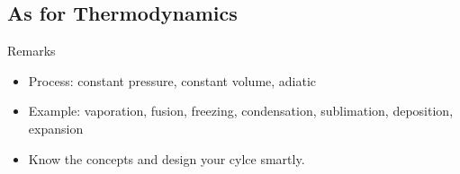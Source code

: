 \documentclass[12pt,compress]{beamer}
\begin{document}
\subsection{As for Thermodynamics}
\begin{frame}{Remarks}
	\begin{itemize}
		\item Process: constant pressure, constant volume, adiatic
		\item Example: vaporation, fusion, freezing, condensation, sublimation, deposition, expansion
		\item Know the concepts and design your cylce smartly.
	\end{itemize}
\end{frame}

\end{document}
